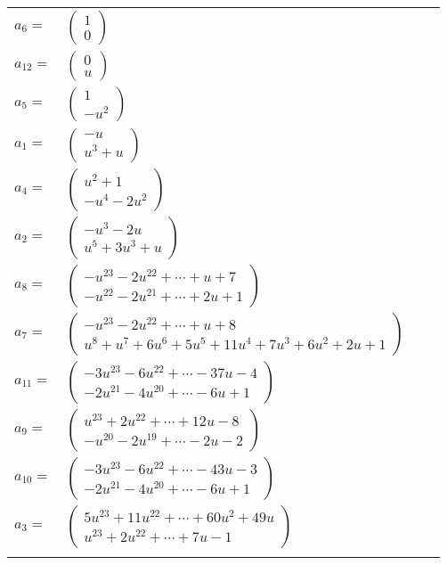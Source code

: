 \documentclass[1p]{elsarticle_modified}
\theoremstyle{definition}
\begin{document}
\begin{tabular}{m{7pt} m{180pt} m{7pt} m{180pt} }
\flushright $a_{6}=$&$\begin{pmatrix}1\\0\end{pmatrix}$ \\
\flushright $a_{12}=$&$\begin{pmatrix}0\\u\end{pmatrix}$ \\
\flushright $a_{5}=$&$\begin{pmatrix}1\\- u^2\end{pmatrix}$ \\
\flushright $a_{1}=$&$\begin{pmatrix}- u\\u^3+u\end{pmatrix}$ \\
\flushright $a_{4}=$&$\begin{pmatrix}u^2+1\\- u^4-2 u^2\end{pmatrix}$ \\
\flushright $a_{2}=$&$\begin{pmatrix}- u^3-2 u\\u^5+3 u^3+u\end{pmatrix}$ \\
\flushright $a_{8}=$&$\begin{pmatrix}- u^{23}-2 u^{22}+\cdots+u+7\\- u^{22}-2 u^{21}+\cdots+2 u+1\end{pmatrix}$ \\
\flushright $a_{7}=$&$\begin{pmatrix}- u^{23}-2 u^{22}+\cdots+u+8\\u^8+u^7+6 u^6+5 u^5+11 u^4+7 u^3+6 u^2+2 u+1\end{pmatrix}$ \\
\flushright $a_{11}=$&$\begin{pmatrix}-3 u^{23}-6 u^{22}+\cdots-37 u-4\\-2 u^{21}-4 u^{20}+\cdots-6 u+1\end{pmatrix}$ \\
\flushright $a_{9}=$&$\begin{pmatrix}u^{23}+2 u^{22}+\cdots+12 u-8\\- u^{20}-2 u^{19}+\cdots-2 u-2\end{pmatrix}$ \\
\flushright $a_{10}=$&$\begin{pmatrix}-3 u^{23}-6 u^{22}+\cdots-43 u-3\\-2 u^{21}-4 u^{20}+\cdots-6 u+1\end{pmatrix}$ \\
\flushright $a_{3}=$&$\begin{pmatrix}5 u^{23}+11 u^{22}+\cdots+60 u^2+49 u\\u^{23}+2 u^{22}+\cdots+7 u-1\end{pmatrix}$\\&\end{tabular}
\end{document}
